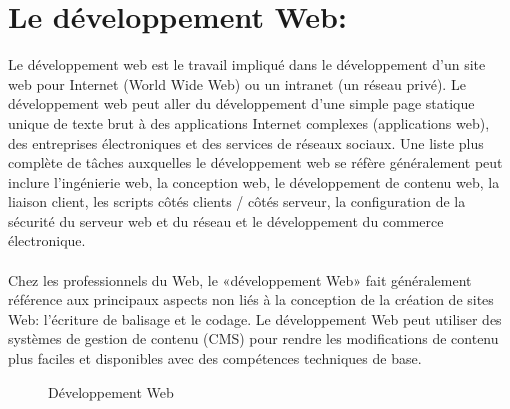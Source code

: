 \documentclass[12pt]{report}
\begin{document}
\section{Le développement Web:}
\vspace{0.2in}
Le développement web est le travail impliqué dans le développement d'un site web pour Internet (World Wide Web) ou un intranet (un réseau privé). Le développement web peut aller du développement d'une simple page statique unique de texte brut à des applications Internet complexes (applications web), des entreprises électroniques et des services de réseaux sociaux. Une liste plus complète de tâches auxquelles le développement web se réfère généralement peut inclure l'ingénierie web, la conception web, le développement de contenu web, la liaison client, les scripts côtés clients / côtés serveur, la configuration de la sécurité du serveur web et du réseau et le développement du commerce électronique.
\\\\
Chez les professionnels du Web, le «développement Web» fait généralement référence aux principaux aspects non liés à la conception de la création de sites Web: l'écriture de balisage et le codage. Le développement Web peut utiliser des systèmes de gestion de contenu (CMS) pour rendre les modifications de contenu plus faciles et disponibles avec des compétences techniques de base.

\vspace{0.6in}

\begin{figure}[h]
\centering
\caption{Développement Web}
\end{figure}

\newpage
\end{document}
